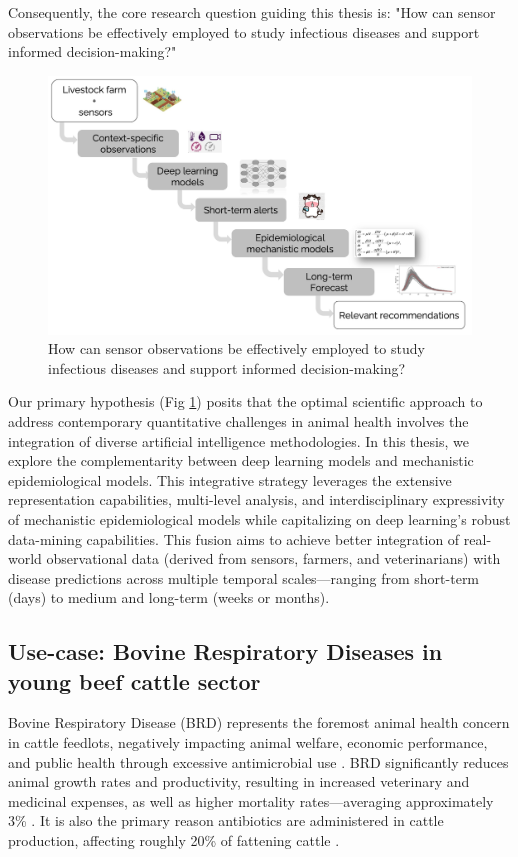 Consequently, the core research question guiding this thesis is: "How can sensor observations be effectively employed to study infectious diseases and support informed decision-making?"

\begin{figure}
  \includegraphics[width=\linewidth]{figures/chap1/chap1-outline.jpg}
  \caption{How can sensor observations be effectively employed to study infectious diseases and support informed decision-making?}
  \label{fig:chap1-outline}
\end{figure}
\newpage

Our primary hypothesis (Fig \ref{fig:chap1-outline}) posits that the optimal scientific approach to address contemporary quantitative challenges in animal health involves the integration of diverse artificial intelligence methodologies. In this thesis, we explore the complementarity between deep learning models and mechanistic epidemiological models. This integrative strategy leverages the extensive representation capabilities, multi-level analysis, and interdisciplinary expressivity of mechanistic epidemiological models while capitalizing on deep learning’s robust data-mining capabilities. This fusion aims to achieve better integration of real-world observational data (derived from sensors, farmers, and veterinarians) with disease predictions across multiple temporal scales—ranging from short-term (days) to medium and long-term (weeks or months).


\subsection{Use-case: Bovine Respiratory Diseases in young beef cattle sector}

Bovine Respiratory Disease (BRD) represents the foremost animal health concern in cattle feedlots, negatively impacting animal welfare, economic performance, and public health through excessive antimicrobial use \cite{s18082674}. BRD significantly reduces animal growth rates and productivity, resulting in increased veterinary and medicinal expenses, as well as higher mortality rates—averaging approximately 3\% 
\cite{Engler_Defoor_King_Gleghorn_2014}. It is also the primary reason antibiotics are administered in cattle production, affecting roughly 20\% of fattening cattle \cite{assie_exposure_2009}.

